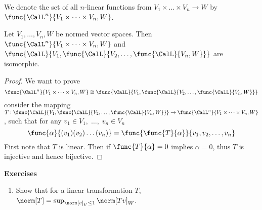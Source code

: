We denote  the set of all \(n\)-linear functions from \(V_1 \times \dots \times V_n \to W\) by \(\func{\CalL^n}{V_1 \times \dots \times V_n, W}\).
\begin{proposition} \label{pr:nLinearIsmorphicLinear}
    Let \(V_1, \dots , V_n, W\) be normed vector spaces. Then \(\func{\CalL^n}{V_1 \times \dots \times V_n, W}\) and \(\func{\CalL}{V_1 , \func{\CalL}{V_2, \dots ,\func{\CalL}{V_n,W}}}\) are isomorphic.
\end{proposition}

\begin{proof}
    We want to prove
    \begin{equation*}
        \func{\CalL^n}{V_1 \times \dots \times V_n, W} \cong \func{\CalL}{V_1 , \func{\CalL}{V_2, \dots ,\func{\CalL}{V_n,W}}}
    \end{equation*}
    consider the mapping \(T : \func{\CalL}{V_1 ,\func{\CalL}{V_2, \dots ,\func{\CalL}{V_n,W}}} \to \func{\CalL^n}{V_1 \times \dots \times V_n, W}\), such that for any \(v_1 \in V_1,\; \dots, \; v_n \in V_n\)
    \begin{equation*}
        \func{\alpha}{(v_1)(v_2) \dots (v_n)} = \func{\func{T}{\alpha}}{v_1,v_2, \dots, v_n}
    \end{equation*}
    First note that \(T\) is linear. Then if \(\func{T}{\alpha} = 0\) implies \(\alpha  = 0\), thus \(T\) is injective and hence bijective.

\end{proof}

{\Large\textbf{Exercises}}
\begin{enumerate}
    \item Show that for a linear transformation \(T\), \(\norm[T] = \sup_{\norm[v]_V \leq 1} \norm[Tv]_W\).
\end{enumerate}
\newpage

